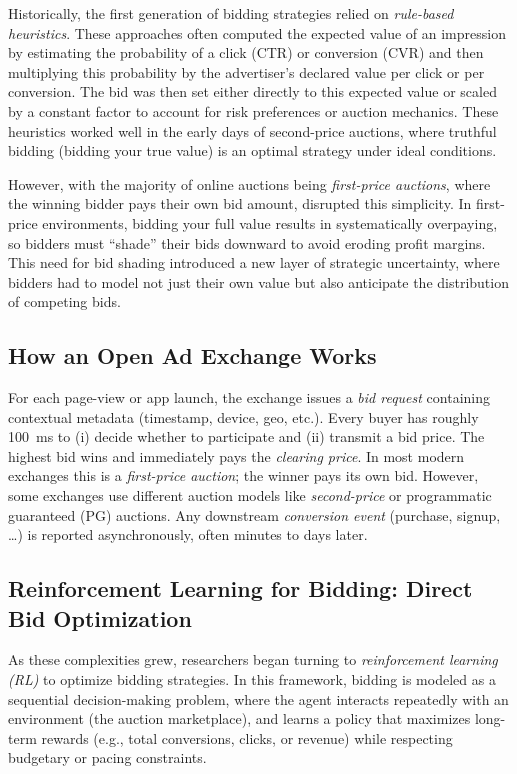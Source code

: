 \documentclass[11pt]{article}
\begin{document}
Historically, the first generation of bidding strategies relied on \emph{rule-based heuristics}. These approaches often computed the expected value of an impression by estimating the probability of a click (CTR) or conversion (CVR) and then multiplying this probability by the advertiser’s declared value per click or per conversion. The bid was then set either directly to this expected value or scaled by a constant factor to account for risk preferences or auction mechanics. These heuristics worked well in the early days of second-price auctions, where truthful bidding (bidding your true value) is an optimal strategy under ideal conditions.

However, with the majority of online auctions being  \emph{first-price auctions}, where the winning bidder pays their own bid amount, disrupted this simplicity. In first-price environments, bidding your full value results in systematically overpaying, so bidders must ``shade'' their bids downward to avoid eroding profit margins. This need for bid shading introduced a new layer of strategic uncertainty, where bidders had to model not just their own value but also anticipate the distribution of competing bids.

\subsection{How an Open Ad Exchange Works}
\label{sec:exchange}

For each page-view or app launch, the exchange issues a \emph{bid
request} containing contextual metadata (timestamp, device, geo,
etc.).  Every buyer has roughly \SI{100}{\milli\second} to (i) decide
whether to participate and (ii) transmit a bid price.
The highest bid wins and immediately pays the \emph{clearing price}.
In most modern exchanges this is a \emph{first-price auction}; the
winner pays its own bid. However, some exchanges use different auction
models like \emph{second-price} or programmatic guaranteed (PG) auctions.
Any downstream \emph{conversion event} (purchase, signup, \dots) is
reported asynchronously, often minutes to days later.

\subsection{Reinforcement Learning for Bidding: Direct Bid Optimization}

As these complexities grew, researchers began turning to \emph{reinforcement learning (RL)} to optimize bidding strategies. In this framework, bidding is modeled as a sequential decision-making problem, where the agent interacts repeatedly with an environment (the auction marketplace), and learns a policy that maximizes long-term rewards (e.g., total conversions, clicks, or revenue) while respecting budgetary or pacing constraints.
\end{document}
